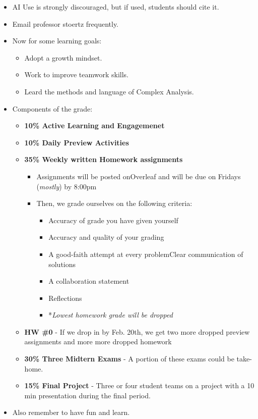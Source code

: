 \documentclass[10pt]{paper}
\begin{document}
\begin{itemize}
  \item AI Use is strongly discouraged, but if used, students should cite it. 
  \item Email professor stoertz frequently. 
  \item Now for some learning goals: \begin{itemize}
    \item Adopt a growth mindset.
    \item Work to improve teamwork skills.
    \item Leard the methods and language of Complex Analysis. 
  \end{itemize}
  \item Components of the grade: \begin{itemize}
    \item \textbf{10\% Active Learning and Engagemenet}
    \item \textbf{10\% Daily Preview Activities}
    \item \textbf{35\% Weekly written Homework assignments} \begin{itemize}
      \item Assignments will be posted onOverleaf and will be due on Fridays (\textit{mostly}) by 8:00pm
      \item Then, we grade ourselves on the following criteria: \begin{itemize}
        \item Accuracy of grade you have given yourself
        \item Accuracy and quality of your grading
        \item A good-faith attempt at every problemClear communication of solutions
        \item A collaboration statement
        \item Reflections
        \item *\textit{Lowest homework grade will be dropped}
      \end{itemize}
    \end{itemize}
    \item \textbf{HW \#0} - If we drop in by Feb. 20th, we get two more dropped preview assignments and more more dropped homework
    \item \textbf{30\% Three Midtern Exams} - A portion of these exams could be take-home.
    \item \textbf{15\% Final Project} - Three or four student teams on a project with a 10 min presentation during the final period. 
  \end{itemize}
  \item Also remember to have fun and learn. 
\end{itemize}
\end{document}
